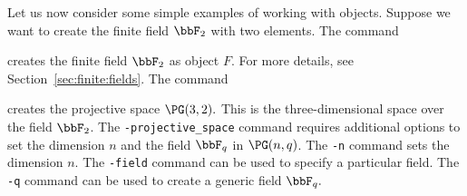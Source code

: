 Let us now consider some simple examples of working with objects. 
Suppose we want to create the finite field $\bbF_2$ with two elements.  
The command 


creates the finite field $\bbF_2$ as object $F$. 
For more details, see Section~\ref{sec:finite:fields}.
The command


creates the projective space $\PG(3,2).$
This is the three-dimensional space over the field $\bbF_2$.
The \verb'-projective_space' command requires additional options to 
set the dimension $n$ and the field $\bbF_q$ in $\PG(n,q)$.
The \verb'-n' command sets the dimension $n$. 
The \verb'-field' command can be used to specify a
particular field. 
The \verb'-q' command can be used to create a generic field $\bbF_q.$

\bigskip



